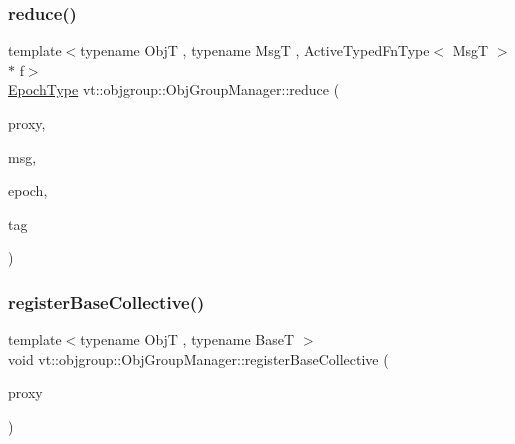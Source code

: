\subsubsection{\texorpdfstring{reduce()}{reduce()}}
{\footnotesize\ttfamily template$<$typename ObjT , typename MsgT , Active\+Typed\+Fn\+Type$<$ Msg\+T $>$ $\ast$ f$>$ \\
\hyperlink{namespacevt_a985a5adf291c34a3ca263b3378388236}{Epoch\+Type} vt\+::objgroup\+::\+Obj\+Group\+Manager\+::reduce (\begin{DoxyParamCaption}\item[{\hyperlink{structvt_1_1objgroup_1_1_obj_group_manager_aea65eef52f240a52210132eef5ce591f}{Proxy\+Type}$<$ ObjT $>$}]{proxy,  }\item[{\hyperlink{namespacevt_ab2b3d506ec8e8d1540aede826d84a239}{Msg\+Shared\+Ptr}$<$ MsgT $>$}]{msg,  }\item[{\hyperlink{namespacevt_a985a5adf291c34a3ca263b3378388236}{Epoch\+Type}}]{epoch,  }\item[{\hyperlink{namespacevt_a84ab281dae04a52a4b243d6bf62d0e52}{Tag\+Type}}]{tag }\end{DoxyParamCaption})}

\mbox{\label{structvt_1_1objgroup_1_1_obj_group_manager_a6e869a6e38c7fe4e176814ca93ecf36e}} 
\subsubsection{\texorpdfstring{register\+Base\+Collective()}{registerBaseCollective()}}
{\footnotesize\ttfamily template$<$typename ObjT , typename BaseT $>$ \\
void vt\+::objgroup\+::\+Obj\+Group\+Manager\+::register\+Base\+Collective (\begin{DoxyParamCaption}\item[{\hyperlink{structvt_1_1objgroup_1_1_obj_group_manager_aea65eef52f240a52210132eef5ce591f}{Proxy\+Type}$<$ ObjT $>$}]{proxy }\end{DoxyParamCaption})}

\mbox{\label{structvt_1_1objgroup_1_1_obj_group_manager_a4b45c347778fda185d97b4c6af4ec58e}} 
